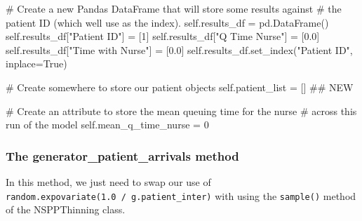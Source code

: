 \documentclass[
  letterpaper,
  DIV=11,
  numbers=noendperiod]{scrreprt}
\newenvironment{Shaded}{}{}
\newcommand{\CommentTok}[1]{\textcolor[rgb]{0.42,0.45,0.49}{#1}}
\newcommand{\DecValTok}[1]{\textcolor[rgb]{0.00,0.36,0.77}{#1}}
\newcommand{\FloatTok}[1]{\textcolor[rgb]{0.00,0.36,0.77}{#1}}
\newcommand{\NormalTok}[1]{\textcolor[rgb]{0.14,0.16,0.18}{#1}}
\newcommand{\OperatorTok}[1]{\textcolor[rgb]{0.14,0.16,0.18}{#1}}
\newcommand{\StringTok}[1]{\textcolor[rgb]{0.01,0.18,0.38}{#1}}
\newcommand{\VariableTok}[1]{\textcolor[rgb]{0.89,0.38,0.04}{#1}}
\begin{document}
\begin{Shaded}
\begin{Highlighting}[]
        \CommentTok{\# Create a new Pandas DataFrame that will store some results against}
        \CommentTok{\# the patient ID (which we\textquotesingle{}ll use as the index).}
        \VariableTok{self}\NormalTok{.results\_df }\OperatorTok{=}\NormalTok{ pd.DataFrame()}
        \VariableTok{self}\NormalTok{.results\_df[}\StringTok{"Patient ID"}\NormalTok{] }\OperatorTok{=}\NormalTok{ [}\DecValTok{1}\NormalTok{]}
        \VariableTok{self}\NormalTok{.results\_df[}\StringTok{"Q Time Nurse"}\NormalTok{] }\OperatorTok{=}\NormalTok{ [}\FloatTok{0.0}\NormalTok{]}
        \VariableTok{self}\NormalTok{.results\_df[}\StringTok{"Time with Nurse"}\NormalTok{] }\OperatorTok{=}\NormalTok{ [}\FloatTok{0.0}\NormalTok{]}
        \VariableTok{self}\NormalTok{.results\_df.set\_index(}\StringTok{"Patient ID"}\NormalTok{, inplace}\OperatorTok{=}\VariableTok{True}\NormalTok{)}

        \CommentTok{\# Create somewhere to store our patient objects}
        \VariableTok{self}\NormalTok{.patient\_list }\OperatorTok{=}\NormalTok{ [] }\CommentTok{\#\# NEW}

        \CommentTok{\# Create an attribute to store the mean queuing time for the nurse}
        \CommentTok{\# across this run of the model}
        \VariableTok{self}\NormalTok{.mean\_q\_time\_nurse }\OperatorTok{=} \DecValTok{0}
\end{Highlighting}
\end{Shaded}

\subsubsection{The generator\_patient\_arrivals
method}\label{the-generator_patient_arrivals-method-2}

In this method, we just need to swap our use of
\texttt{random.expovariate(1.0\ /\ g.patient\_inter)} with using the
\texttt{sample()} method of the NSPPThinning class.
\end{document}
